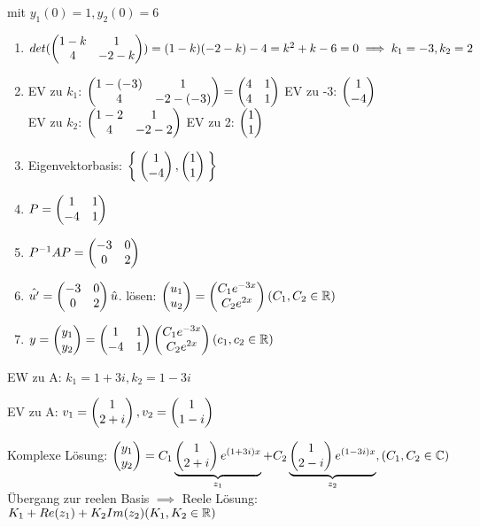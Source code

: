 \documentclass{../tudscript}
\begin{document}
        mit $y_1(0) = 1, y_2 (0) = 6$
        \begin{enumerate}
            \item $det(\begin{pmatrix} 1-k & 1 \\ 4 & -2 -k \end{pmatrix}) = (1-k)(-2-k) -4 = k^2 + k - 6 = 0 \implies k_1 = -3, k_2 = 2$
            \item EV zu $k_1$: $\begin{pmatrix} 1-(-3) & 1 \\ 4 & -2-(-3) \end{pmatrix} = \begin{pmatrix} 4 & 1 \\ 4 & 1 \end{pmatrix}$ EV zu -3: $\begin{pmatrix} 1 \\ -4 \end{pmatrix}$\\
                  EV zu $k_2$: $\begin{pmatrix} 1-2 & 1 \\ 4 & -2-2 \end{pmatrix}$ EV zu 2: $\begin{pmatrix} 1 \\ 1 \end{pmatrix}$
            \item Eigenvektorbasis: $\Set{ \begin{pmatrix} 1 \\ -4 \end{pmatrix} ,  \begin{pmatrix} 1 \\1 \end{pmatrix} }$ 
            \item $P = \begin{pmatrix} 1 & 1 \\ -4 & 1 \end{pmatrix}$
            \item $P^{-1}AP = \begin{pmatrix} -3 & 0 \\ 0 & 2 \end{pmatrix}$
            \item $\hat{u'} = \begin{pmatrix} -3 & 0 \\ 0 & 2 \end{pmatrix} \hat{u}$. lösen: $\begin{pmatrix} u_1 \\ u_2 \end{pmatrix} = \begin{pmatrix} C_1 e^{-3x} \\ C_2 e^{2x} \end{pmatrix} (C_1, C_2 \in \mathbb{R})$ 
            \item $y = \begin{pmatrix} y_1 \\ y_2 \end{pmatrix} = \begin{pmatrix} 1 & 1 \\ -4 & 1 \end{pmatrix} \begin{pmatrix} C_1 e^{-3x} \\ C_2 e^{2x} \end{pmatrix} (c_1, c_2 \in \mathbb{R})$
    \end{enumerate}
    
        EW zu A: $k_1 = 1+3i, k_2 = 1-3i$

        EV zu A: $v_1 = \begin{pmatrix} 1 \\ 2+ i \end{pmatrix}, v_2 = \begin{pmatrix} 1 \\ 1-i \end{pmatrix}$

        Komplexe Lösung: $\begin{pmatrix} y_1 \\ y_2 \end{pmatrix} = C_1 \underbrace{\begin{pmatrix} 1 \\ 2+i \end{pmatrix} e^{(1+3i)x}}_{z_1} +  C_2 \underbrace{\begin{pmatrix} 1 \\ 2-i \end{pmatrix} e^{(1-3i)x}}_{z_2}, (C_1, C_2 \in \mathbb{C})$
        Übergang zur reelen Basis $\implies$ Reele Lösung:
        $K_1 + Re(z_1) + K_2 Im(z_2) (K_1, K_2 \in \mathbb{R})$
\end{document}
